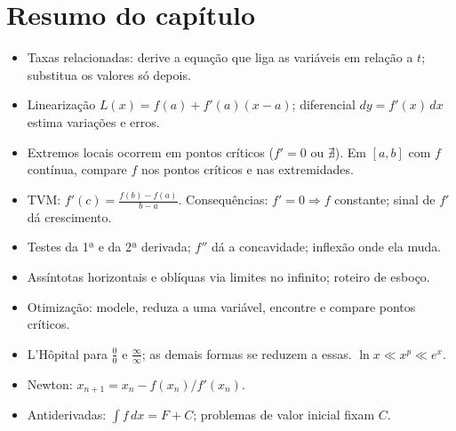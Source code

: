 \section*{Resumo do capítulo}
\begin{itemize}
\item Taxas relacionadas: derive a equação que liga as variáveis em relação a $t$; substitua
  os valores só depois.
\item Linearização $L(x)=f(a)+f'(a)(x-a)$; diferencial $dy=f'(x)\,dx$ estima variações e
  erros.
\item Extremos locais ocorrem em pontos críticos ($f'=0$ ou $\nexists$). Em $[a,b]$ com $f$
  contínua, compare $f$ nos pontos críticos e nas extremidades.
\item TVM: $f'(c)=\frac{f(b)-f(a)}{b-a}$. Consequências: $f'=0\Rightarrow f$ constante; sinal
  de $f'$ dá crescimento.
\item Testes da 1ª e da 2ª derivada; $f''$ dá a concavidade; inflexão onde ela muda.
\item Assíntotas horizontais e oblíquas via limites no infinito; roteiro de esboço.
\item Otimização: modele, reduza a uma variável, encontre e compare pontos críticos.
\item L'Hôpital para $\frac00$ e $\frac\infty\infty$; as demais formas se reduzem a essas.
  $\ln x\ll x^p\ll e^x$.
\item Newton: $x_{n+1}=x_n-f(x_n)/f'(x_n)$.
\item Antiderivadas: $\int f\,dx=F+C$; problemas de valor inicial fixam $C$.
\end{itemize}


